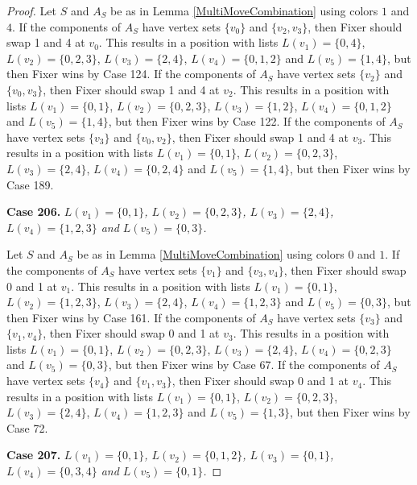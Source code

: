 \documentclass[12pt]{amsart}
\theoremstyle{plain}
\theoremstyle{definition}
\theoremstyle{remark}
\begin{document}
\begin{proof}
Let $S$ and $A_S$ be as in Lemma \ref{MultiMoveCombination} using colors $1$ and $4$. If the components of $A_S$ have vertex sets $\{v_0\}$ and $\{v_2, v_3\}$, then Fixer should swap 1 and 4 at $v_0$. This results in a position with lists $L(v_1) = \{0, 4\}$, $L(v_2) = \{0, 2, 3\}$, $L(v_3) = \{2, 4\}$, $L(v_4) = \{0, 1, 2\}$ and $L(v_5) = \{1, 4\}$, but then Fixer wins by Case 124.
If the components of $A_S$ have vertex sets $\{v_2\}$ and $\{v_0, v_3\}$, then Fixer should swap 1 and 4 at $v_2$. This results in a position with lists $L(v_1) = \{0, 1\}$, $L(v_2) = \{0, 2, 3\}$, $L(v_3) = \{1, 2\}$, $L(v_4) = \{0, 1, 2\}$ and $L(v_5) = \{1, 4\}$, but then Fixer wins by Case 122.
If the components of $A_S$ have vertex sets $\{v_3\}$ and $\{v_0, v_2\}$, then Fixer should swap 1 and 4 at $v_3$. This results in a position with lists $L(v_1) = \{0, 1\}$, $L(v_2) = \{0, 2, 3\}$, $L(v_3) = \{2, 4\}$, $L(v_4) = \{0, 2, 4\}$ and $L(v_5) = \{1, 4\}$, but then Fixer wins by Case 189.

\noindent\textbf{Case 206.  }\textit{$L(v_1) = \{0, 1\}$, $L(v_2) = \{0, 2, 3\}$, $L(v_3) = \{2, 4\}$, $L(v_4) = \{1, 2, 3\}$ and $L(v_5) = \{0, 3\}$.}

Let $S$ and $A_S$ be as in Lemma \ref{MultiMoveCombination} using colors $0$ and $1$. If the components of $A_S$ have vertex sets $\{v_1\}$ and $\{v_3, v_4\}$, then Fixer should swap 0 and 1 at $v_1$. This results in a position with lists $L(v_1) = \{0, 1\}$, $L(v_2) = \{1, 2, 3\}$, $L(v_3) = \{2, 4\}$, $L(v_4) = \{1, 2, 3\}$ and $L(v_5) = \{0, 3\}$, but then Fixer wins by Case 161.
If the components of $A_S$ have vertex sets $\{v_3\}$ and $\{v_1, v_4\}$, then Fixer should swap 0 and 1 at $v_3$. This results in a position with lists $L(v_1) = \{0, 1\}$, $L(v_2) = \{0, 2, 3\}$, $L(v_3) = \{2, 4\}$, $L(v_4) = \{0, 2, 3\}$ and $L(v_5) = \{0, 3\}$, but then Fixer wins by Case 67.
If the components of $A_S$ have vertex sets $\{v_4\}$ and $\{v_1, v_3\}$, then Fixer should swap 0 and 1 at $v_4$. This results in a position with lists $L(v_1) = \{0, 1\}$, $L(v_2) = \{0, 2, 3\}$, $L(v_3) = \{2, 4\}$, $L(v_4) = \{1, 2, 3\}$ and $L(v_5) = \{1, 3\}$, but then Fixer wins by Case 72.

\noindent\textbf{Case 207.  }\textit{$L(v_1) = \{0, 1\}$, $L(v_2) = \{0, 1, 2\}$, $L(v_3) = \{0, 1\}$, $L(v_4) = \{0, 3, 4\}$ and $L(v_5) = \{0, 1\}$.}


\end{proof}
\end{document}

